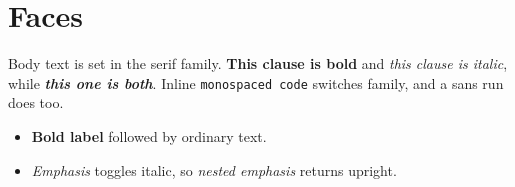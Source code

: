 \documentclass{article}
\begin{document}
\section{Faces}

Body text is set in the serif family. \textbf{This clause is bold} and
\textit{this clause is italic}, while \textbf{\textit{this one is both}}.
Inline \texttt{monospaced code} switches family, and {\sffamily a sans run}
does too.

\begin{itemize}
  \item \textbf{Bold label} followed by ordinary text.
  \item \emph{Emphasis} toggles italic, so \emph{nested \emph{emphasis}}
  returns upright.
\end{itemize}
\end{document}
